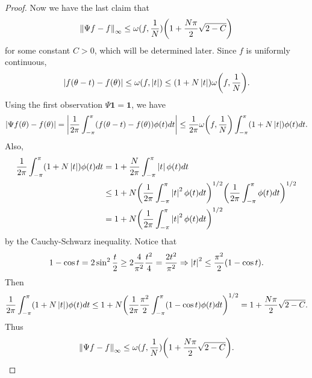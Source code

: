 \begin{proof}
    Now we have the last claim that 
    \begin{equation*}
        \norm{\Psi f - f}_\infty \leq \omega(f,\frac{1}{N})\pth{1 + \frac{N\pi}{2}\sqrt{2 - C}} 
    \end{equation*}
    for some constant $C>0$, which will be determined later. Since $f$ is uniformly continuous, 
    \begin{equation*}
        \abs{f(\theta - t) - f(\theta)} \leq \omega\pth{f,\abs{t}} \leq (1 + N\abs{t})\omega\pth{f,\frac{1}{N}}.
    \end{equation*}
    Using the first observation $\Psi \mathbf{1} = \mathbf{1}$, we have
    \begin{equation*}
        \abs{\Psi f(\theta) - f(\theta)} = \abs{\frac{1}{2\pi}\int_{-\pi}^{\pi}\pth{f(\theta - t) - f(\theta)}\phi(t)dt}
        \leq \frac{1}{2\pi}\omega\pth{f,\frac{1}{N}}\int_{-\pi}^{\pi}\pth{1 + N\abs{t}}\phi(t)dt.
    \end{equation*}
    Also, 
    \begin{equation*}
        \begin{split}
            \frac{1}{2\pi}\int_{-\pi}^{\pi} \pth{1 + N\abs{t}}\phi(t)dt &= 1 + \frac{N}{2\pi}\int_{-\pi}^{\pi} \abs{t}\phi(t)dt \\
            &\leq 1 + N\pth{\frac{1}{2\pi}\int_{-\pi}^{\pi} \abs{t}^2\phi(t)dt}^{1/2}\pth{\frac{1}{2\pi}\int_{-\pi}^{\pi} \phi(t)dt}^{1/2} \\
            &= 1 + N\pth{\frac{1}{2\pi}\int_{-\pi}^{\pi} \abs{t}^2\phi(t)dt}^{1/2}
        \end{split}
    \end{equation*}
    by the Cauchy-Schwarz inequality. Notice that 
    \begin{equation*}
        1 - \cos t = 2\sin^2\frac{t}{2} \geq 2\frac{4}{\pi^2}\frac{t^2}{4} = \frac{2t^2}{\pi^2} 
        \Rightarrow \left\lvert {t} \right\rvert^2 \leq \frac{\pi^2}{2}(1-\cos t).
    \end{equation*}
    Then 
    \begin{equation*}
        \frac{1}{2\pi}\int_{-\pi}^{\pi} \pth{1 + N\abs{t}}\phi(t)dt \leq 1 + N\pth{\frac{1}{2\pi}\frac{\pi^2}{2}\int_{-\pi}^{\pi} (1-\cos t)\phi(t)dt}^{1/2} 
        = 1 + \frac{N\pi}{2}\sqrt{2 - C}.
    \end{equation*}
    Thus 
    \begin{equation*}
        \norm{\Psi f - f}_\infty \leq \omega(f,\frac{1}{N})\pth{1 + \frac{N\pi}{2}\sqrt{2 - C}}.
    \end{equation*}


\end{proof}
